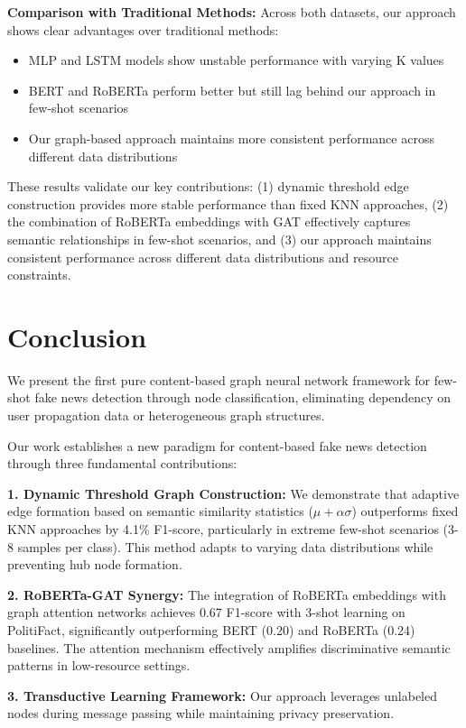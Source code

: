 \documentclass[conference]{IEEEtran}
\begin{document}
\textbf{Comparison with Traditional Methods:} Across both datasets, our approach shows clear advantages over traditional methods:
\begin{itemize}
    \item MLP and LSTM models show unstable performance with varying K values
    \item BERT and RoBERTa perform better but still lag behind our approach in few-shot scenarios
    \item Our graph-based approach maintains more consistent performance across different data distributions
\end{itemize}

These results validate our key contributions: (1) dynamic threshold edge construction provides more stable performance than fixed KNN approaches, (2) the combination of RoBERTa embeddings with GAT effectively captures semantic relationships in few-shot scenarios, and (3) our approach maintains consistent performance across different data distributions and resource constraints.

\section{Conclusion}
\label{sec:conclusion}

We present the first pure content-based graph neural network framework for few-shot fake news detection through node classification, eliminating dependency on user propagation data or heterogeneous graph structures. 

Our work establishes a new paradigm for content-based fake news detection through three fundamental contributions:

\textbf{1. Dynamic Threshold Graph Construction:} We demonstrate that adaptive edge formation based on semantic similarity statistics ($\mu + \alpha\sigma$) outperforms fixed KNN approaches by 4.1\% F1-score, particularly in extreme few-shot scenarios (3-8 samples per class). This method adapts to varying data distributions while preventing hub node formation.

\textbf{2. RoBERTa-GAT Synergy:} The integration of RoBERTa embeddings with graph attention networks achieves 0.67 F1-score with 3-shot learning on PolitiFact, significantly outperforming BERT (0.20) and RoBERTa (0.24) baselines. The attention mechanism effectively amplifies discriminative semantic patterns in low-resource settings.

\textbf{3. Transductive Learning Framework:} Our approach leverages unlabeled nodes during message passing while maintaining privacy preservation.
\end{document}
